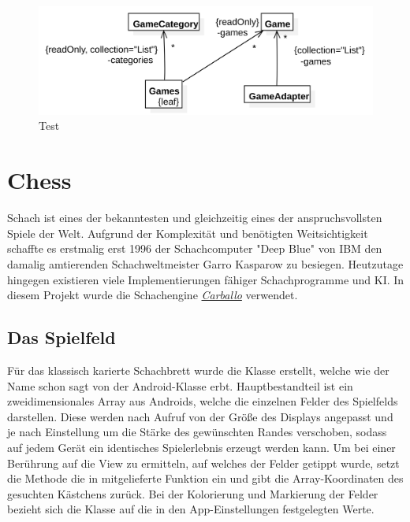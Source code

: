 \begin{figure}[h]
	\centering
	\includegraphics{resources/gamemanager/gamemanager_uml}
	\caption{Test}
	\label{fig:gm_uml}
\end{figure}

\section{Chess}
\sectionauthor{\oliver}

Schach ist eines der bekanntesten und gleichzeitig eines der anspruchsvollsten
Spiele der Welt. Aufgrund der Komplexität und benötigten Weitsichtigkeit
schaffte es erstmalig erst 1996 der Schachcomputer "Deep Blue" von IBM den
damalig amtierenden Schachweltmeister Garro Kasparow zu besiegen.
 Heutzutage hingegen existieren viele Implementierungen
fähiger Schachprogramme und KI. In diesem Projekt wurde die Schachengine
\hyperlink{https://github.com/albertoruibal/carballo}{\emph{Carballo}}
verwendet.  

\subsection{Das Spielfeld}

Für das klassisch karierte Schachbrett wurde die Klasse
 erstellt, welche wie der Name schon sagt von der
Android-Klasse  erbt. Hauptbestandteil ist ein zweidimensionales
Array aus Androids, welche die einzelnen Felder des Spielfelds
darstellen. Diese werden nach Aufruf von  der Größe des
Displays angepasst und je nach Einstellung um die Stärke des gewünschten Randes
verschoben, sodass auf jedem Gerät ein identisches Spielerlebnis erzeugt werden
kann. Um bei einer Berührung auf die View zu ermitteln, auf welches der Felder
getippt wurde, setzt die Methode  die in
 mitgelieferte Funktion  ein und gibt
die Array-Koordinaten des gesuchten Kästchens zurück. Bei der Kolorierung und
Markierung der Felder bezieht sich die Klasse auf die in den App-Einstellungen
festgelegten Werte.

